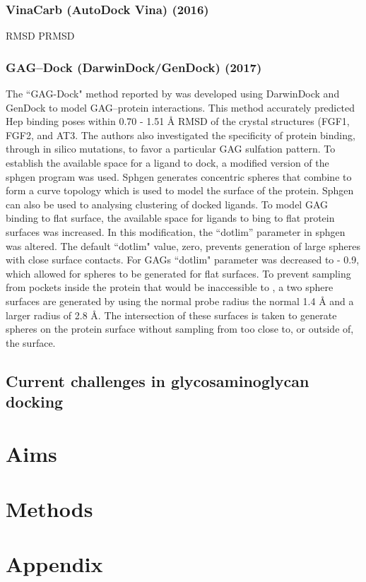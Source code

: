 \documentclass[journal=jctcce,manuscript=article]{achemso}
\begin{document}
{\subsubsection{VinaCarb (AutoDock Vina) (2016)}
\ac{RMSD}
\ac{PRMSD}

\subsubsection{GAG--Dock (DarwinDock/GenDock) (2017)}
The ``GAG-Dock" method reported by
\citeauthor{Griffith2017PredictingGrowth}\cite{Griffith2017PredictingGrowth} was developed using DarwinDock and GenDock to model GAG--protein interactions. This method accurately predicted \ac{Hep} binding poses within 0.70 - 1.51 \r{A} \ac{RMSD} of the crystal structures (\ac{FGF1}, \ac{FGF2}, and \ac{AT3}. The authors also investigated the specificity of protein binding, through in silico mutations, to favor a particular GAG sulfation pattern. 
To establish the available space for a ligand to dock, a modified version of the sphgen program\cite{Moustakas2006Development5} was used. Sphgen generates concentric spheres that combine to form a curve topology which is used to model the surface of the protein. 
Sphgen can also be used to analysing clustering of docked ligands.\cite{Hendrix1998SurfaceDocking.}
To model \ac{GAG} binding to flat surface, the available space for ligands to bing to flat protein surfaces was increased. In this modification, the “dotlim” parameter in sphgen was altered. The default ``dotlim" value, zero, prevents generation of large spheres with close surface contacts.\cite{Hendrix1998SurfaceDocking.} For \acp{GAG} ``dotlim" parameter was decreased to - 0.9, which allowed for spheres to be generated for flat surfaces.\cite{Griffith2017PredictingGrowth} To prevent sampling from pockets inside the protein that would be inaccessible to , a two sphere surfaces are generated by using the normal probe radius the normal 1.4 \r{A} and a larger radius of 2.8 \r{A}. The intersection of these surfaces is taken to generate spheres on the protein surface without sampling from too close to, or outside of, the surface.\cite{Griffith2017PredictingGrowth} 

\subsection{Current challenges in glycosaminoglycan docking}


\section{Aims}

\section{Methods}


}
\newpage
{

}
\newpage
\section{Appendix}
\end{document}
